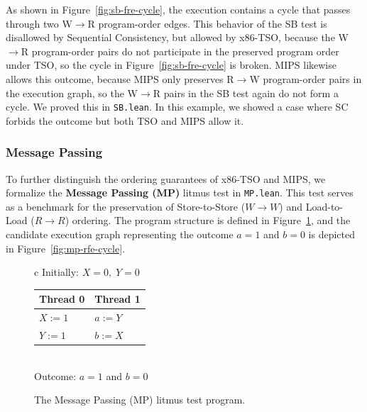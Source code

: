 As shown in Figure~\ref{fig:sb-fre-cycle}, the execution contains a cycle that passes through two W$\to$R program-order edges. This behavior of the SB test is disallowed by Sequential Consistency, but allowed by x86-TSO, because the W$\to$R program-order pairs do not participate in the preserved program order under TSO, so the cycle in Figure~\ref{fig:sb-fre-cycle} is broken. MIPS likewise allows this outcome, because MIPS only preserves R$\to$W program-order pairs in the execution graph, so the W$\to$R pairs in the SB test again do not form a cycle. We proved this in \texttt{SB.lean}. In this example, we showed a case where SC forbids the outcome but both TSO and MIPS allow it.

\subsubsection{Message Passing}

\label{subsec:message_passing}

To further distinguish the ordering guarantees of x86-TSO and MIPS, we formalize the \textbf{Message Passing (MP)} litmus test in \texttt{MP.lean}. This test serves as a benchmark for the preservation of Store-to-Store ($W \to W$) and Load-to-Load ($R \to R$) ordering. The program structure is defined in Figure~\ref{fig:mp-program}, and the candidate execution graph representing the outcome $a = 1$ and $b = 0$ is depicted in Figure~\ref{fig:mp-rfe-cycle}.

\begin{figure}[ht]
\centering
\begin{tabular}{c}
Initially: $X = 0,\; Y = 0$ \\[6pt]
\begin{tabular}{l|l}
\textbf{Thread 0} & \textbf{Thread 1} \\
\hline
$X := 1$ & $a := Y$ \\
$Y := 1$ & $b := X$ \\
\end{tabular} \\[6pt]
Outcome: $a = 1$ and $b = 0$
\end{tabular}
\caption{The Message Passing (MP) litmus test program.}
\label{fig:mp-program}
\end{figure}

